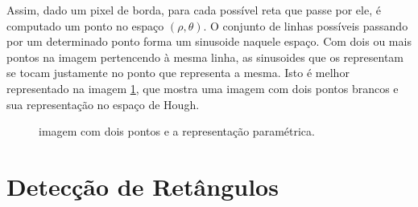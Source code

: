 
Assim, dado um pixel de borda, para cada possível reta que passe por ele, é computado um ponto no espaço $(\rho,\theta)$. O conjunto de linhas possíveis passando por um determinado ponto forma um sinusoide naquele espaço. Com dois ou mais pontos na imagem pertencendo à mesma linha, as sinusoides que os representam se tocam justamente no ponto que representa a mesma. Isto é melhor representado na imagem \ref{houghlinhas}, que mostra uma imagem com dois pontos brancos e sua representação no espaço de Hough.


\begin{figure}[h]
  \centering
  \hfill
  \caption{imagem com dois pontos e a representação paramétrica.}
  \label{houghlinhas}
\end{figure}

\section{Detecção de Retângulos}

